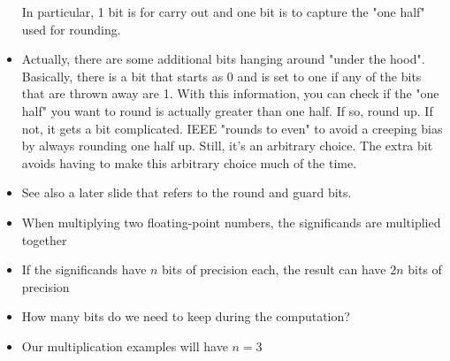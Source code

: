 \begin{frame}[fragile]
\begin{itemize}
	In particular, 1 bit is for carry out and one bit is to capture the
	"one half" used for rounding.
\item Actually, there are some additional bits hanging around "under the hood".
	Basically, there is a bit that starts as 0 and is set to one if any
	of the bits that are thrown away are 1.  With this information, you
	can check if the "one half" you want to round is actually greater
	than one half.  If so, round up.  If not, it gets a bit complicated.
	IEEE "rounds to even" to avoid a creeping bias by always rounding
	one half up.  Still, it's an arbitrary choice.  The extra bit avoids 
	having to make this arbitrary choice much of the time.
\item See also a later slide that refers to the round and guard bits.
\end{itemize}
\fi\ENotes
\end{frame}

\begin{frame}[fragile]
\begin{itemize}
\item When multiplying two floating-point numbers, the significands
  are multiplied together
\item If the significands have $n$ bits of precision each, the result
  can have $2n$ bits of precision
\item How many bits do we need to keep during the computation?
\item Our multiplication examples will have $n=3$
\end{itemize}

\BNotes\ifnum{}
~%
\fi\ENotes
\end{frame}

